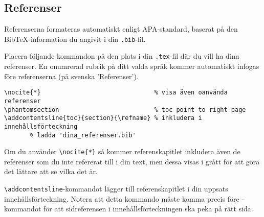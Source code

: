 





\subsection{Referenser}
\label{referenser}

Referenserna formateras automatiskt enligt APA-standard, baserat på den
BibTeX-information du angivit i din \verb|.bib|-fil.

Placera följande kommandon på den plats i din \verb|.tex|-fil där du vill ha
dina referenser. En onumrerad rubrik på ditt valda språk kommer automatiskt
infogas före referenserna (på svenska 'Referenser').

\begin{verbatim}
\nocite{*}                               % visa även oanvända referenser
\phantomsection                          % toc point to right page
\addcontentsline{toc}{section}{\refname} % inkludera i innehållsförteckning
       % ladda 'dina_referenser.bib'
\end{verbatim}

Om du använder \verb|\nocite{*}| så kommer referenskapitlet inkludera även de
referenser som du inte refererat till i din text, men dessa visas i grått för
att göra det lättare att se vilka det är.

\verb|\addcontentsline|-kommandot lägger till referenskapitlet i din uppsats
innehållsförteckning. Notera att detta kommando måste komma precis före
\verb||-kommandot för att sidreferensen i innehållsförteckningen
ska peka på rätt sida.

